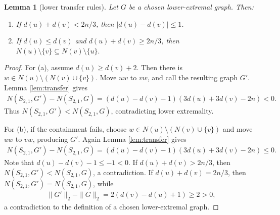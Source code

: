 \documentclass[10pt,a4paper]{article}
\newtheorem{lemma}[definition]{Lemma}
\newcommand{\normsq}[1]{\|#1\|_2}
\begin{document}
\begin{lemma}[lower transfer rules]\label{lem:lower-transfer}
Let $G$ be a chosen lower-extremal graph.  Then:
\begin{enumerate}[label=\textup{(\alph*)}]
\item If $d(u)+d(v)<2n/3$, then $|d(u)-d(v)|\le1$.
\item If $d(u)\le d(v)$ and $d(u)+d(v)\ge2n/3$, then
$
  N(u)\setminus\{v\}\subseteq N(v)\setminus\{u\}.
$
\end{enumerate}
\end{lemma}

\begin{proof}
For (a), assume $d(u)\ge d(v)+2$.  Then there is $w\in N(u)\setminus (N(v)\cup\{v\})$.  Move $uw$ to $vw$, and call the resulting graph $G'$.  Lemma \ref{lem:transfer} gives
\begin{align*}
  N(S_{2,1},G')-N(S_{2,1},G)=(d(u)-d(v)-1)(3d(u)+3d(v)-2n)<0.
\end{align*}
Thus $N(S_{2,1},G')<N(S_{2,1},G)$, contradicting lower extremality.

For (b), if the containment fails, choose $w\in N(u)\setminus (N(v)\cup\{v\})$ and move $uw$ to $vw$, producing $G'$.  Again Lemma \ref{lem:transfer} gives
\begin{align*}
  N(S_{2,1},G')-N(S_{2,1},G)=(d(u)-d(v)-1)(3d(u)+3d(v)-2n)\le0.
\end{align*}
Note that $d(u)-d(v)-1\le -1<0$.  If $d(u)+d(v)>2n/3$, then $N(S_{2,1},G')<N(S_{2,1},G)$, a contradiction.  If $d(u)+d(v)=2n/3$, then $N(S_{2,1},G')=N(S_{2,1},G)$, while
\begin{align*}
  \normsq{G'}-\normsq{G}=2(d(v)-d(u)+1)\ge2>0,
\end{align*}
a contradiction to the definition of a chosen lower-extremal graph.
\end{proof}
\end{document}

